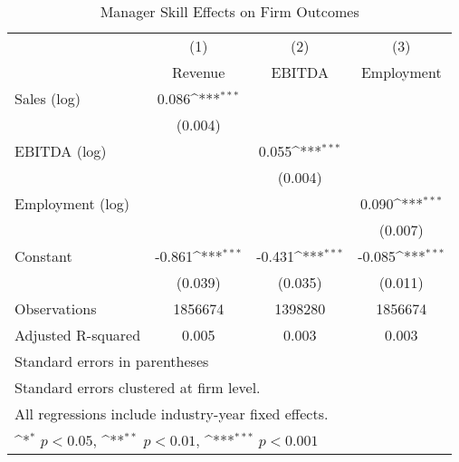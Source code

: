 \begin{table}[htbp]\centering
\def\sym#1{\ifmmode^{#1}\else\(^{#1}\)\fi}
\caption{Manager Skill Effects on Firm Outcomes}
\begin{tabular}{l*{3}{c}}
\toprule
                    &\multicolumn{1}{c}{(1)}&\multicolumn{1}{c}{(2)}&\multicolumn{1}{c}{(3)}\\
                    &\multicolumn{1}{c}{Revenue}&\multicolumn{1}{c}{EBITDA}&\multicolumn{1}{c}{Employment}\\
\midrule
Sales (log)         &       0.086\sym{***}&                     &                     \\
                    &     (0.004)         &                     &                     \\
\addlinespace
EBITDA (log)        &                     &       0.055\sym{***}&                     \\
                    &                     &     (0.004)         &                     \\
\addlinespace
Employment (log)    &                     &                     &       0.090\sym{***}\\
                    &                     &                     &     (0.007)         \\
\addlinespace
Constant            &      -0.861\sym{***}&      -0.431\sym{***}&      -0.085\sym{***}\\
                    &     (0.039)         &     (0.035)         &     (0.011)         \\
\midrule
Observations        &     1856674         &     1398280         &     1856674         \\
Adjusted R-squared  &       0.005         &       0.003         &       0.003         \\
\bottomrule
\multicolumn{4}{l}{\footnotesize Standard errors in parentheses}\\
\multicolumn{4}{l}{\footnotesize Standard errors clustered at firm level.}\\
\multicolumn{4}{l}{\footnotesize All regressions include industry-year fixed effects.}\\
\multicolumn{4}{l}{\footnotesize \sym{*} \(p<0.05\), \sym{**} \(p<0.01\), \sym{***} \(p<0.001\)}\\
\end{tabular}
\end{table}
